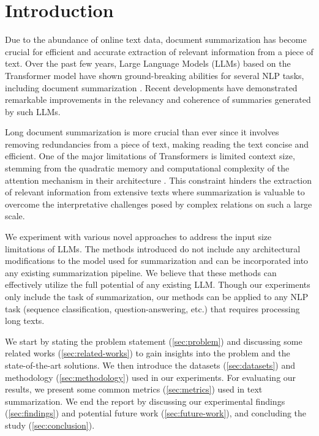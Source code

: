 \section{Introduction}
	\label{sec:introduction}

	Due to the abundance of online text data, document summarization has become crucial
	for efficient and accurate extraction of relevant information from a piece of text.
	Over the past few years, Large Language Models (LLMs) based on the Transformer model
	\cite{vaswani2017attention} have shown ground-breaking abilities for several NLP tasks,
	including document summarization \cite{yadav2023state}.
	Recent developments have demonstrated remarkable improvements in the relevancy and
	coherence of summaries generated by such LLMs.

	Long document summarization is more crucial than ever since it involves removing redundancies
	from a piece of text, making reading the text concise and efficient.
	One of the major limitations of Transformers is limited context size, stemming from the
	quadratic memory and computational complexity of the attention mechanism in their architecture
	\cite{du2023improving}.
	This constraint hinders the extraction of relevant information from extensive texts where
	summarization is valuable to overcome the interpretative challenges posed by complex
	relations on such a large scale.

	We experiment with various novel approaches to address the input size limitations of LLMs.
	The methods introduced do not include any architectural modifications to the model used for
	summarization and can be incorporated into any existing summarization pipeline.
	We believe that these methods can effectively utilize the full potential of any existing LLM.
	Though our experiments only include the task of summarization, our methods can be applied
	to any NLP task (sequence classification, question-answering, etc.) that requires processing
	long texts.

	We start by stating the problem statement (\ref{sec:problem}) and discussing some related works
	(\ref{sec:related-works}) to gain insights into the problem and the state-of-the-art solutions.
	We then introduce the datasets (\ref{sec:datasets}) and methodology (\ref{sec:methodology}) used
	in our experiments.
	For evaluating our results, we present some common metrics (\ref{sec:metrics}) used in text
	summarization.
	We end the report by discussing our experimental findings (\ref{sec:findings}) and potential
	future work (\ref{sec:future-work}), and concluding the study (\ref{sec:conclusion}).

